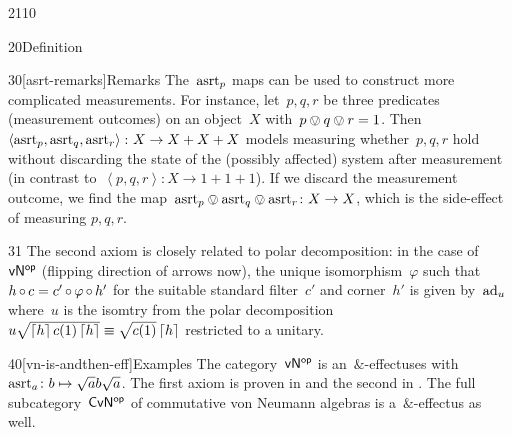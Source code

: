 \begin{parsec}{2110}
\begin{point}{20}{Definition}
\begin{point}{30}[asrt-remarks]{Remarks}
The~$\mathrm{asrt}_p$ maps can be used to construct more complicated measurements.
For instance, let~$p, q, r$ be three predicates (measurement outcomes)
    on an object~$X$
    with~$p \ovee q \ovee r = 1$.
Then~$\left<\mathrm{asrt}_p,\mathrm{asrt}_q,\mathrm{asrt}_r\right>\colon X \to X + X + X $
    models measuring whether~$p,q,r$ hold
    without discarding the state of the (possibly affected) system
    after measurement
    (in contrast to~$\left<p,q,r\right>\colon X \to 1+1+1$).
If we discard the measurement outcome,
    we find the map~$\mathrm{asrt}_p \ovee \mathrm{asrt}_q \ovee \mathrm{asrt}_r \colon X \to X$,
    which is the side-effect of measuring $p,q,r$.
\begin{point}{31}
The second axiom is closely related to polar decomposition:
    in the case of~${\mathsf{vN}}{^{\mathsf{op}}}$ (flipping direction of arrows now),
    the unique isomorphism~$\varphi$
    such that~$h \mathop{\circ} c = c' \mathop{\circ} \varphi \mathop{\circ} h'$
    for the suitable standard filter~$c'$ and corner~$h'$
    is given by~$\mathrm{ad}_u$
    where~$u$ is the isomtry from the
    polar decomposition~$u \sqrt{\left\lceil h\right\rceil c(1)\left\lceil h\right\rceil}
        \equiv \sqrt{c(1)} \left\lceil h\right\rceil$
    restricted to a unitary.
\end{point}
\end{point}
\end{point}
\begin{point}{40}[vn-is-andthen-eff]{Examples}%
The category~${\mathsf{vN}}{^{\mathsf{op}}}$ is an~$\&$-effectuses
    with~$\mathrm{asrt}_a\colon b \mapsto \sqrt{a}b\sqrt{a}$.
The first axiom is proven in 
    and the second in .
The full subcategory~${\mathsf{CvN}}{^{\mathsf{op}}}$ of commutative von Neumann algebras
    is a~$\&$-effectus as well.


\end{point}
\end{parsec}
